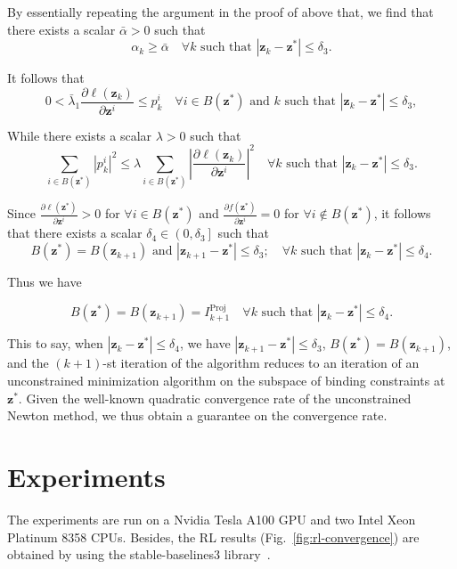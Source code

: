 \documentclass{article}
\theoremstyle{plain}
\theoremstyle{definition}
\def \z {\mathbf{z}}
\begin{document}
By essentially repeating the argument in the proof of above that, we find that there exists a scalar \(\bar{\alpha} > 0\) such that
\[
\alpha_k \geq \bar{\alpha} \quad \forall k \text{ such that } \left|\z_k - \z^*\right| \leq \delta_3.
\]

It follows that
\[
  0 < \bar{\lambda}_1 \frac{\partial \ell\left(\z_k\right)}{\partial \z^i} \leq p_k^i \quad \forall i \in B\left(\z^*\right) \text{ and } k \text{ such that } \left|\z_k - \z^*\right| \leq \delta_3,
\]



While there exists a scalar \(\lambda > 0\) such that
\[
  \sum_{i \in B\left(\z^*\right)}\left|p_k^i\right|^2 \leq \lambda \sum_{i \in B\left(\z^*\right)}\left|\frac{\partial \ell\left(\z_k\right)}{\partial \z^i}\right|^2 \quad \forall k \text{ such that } \left|\z_k - \z^*\right| \leq \delta_3.
\]

Since \(\frac{\partial \ell\left(\z^*\right)}{\partial \z^i} > 0\) for \(\forall i \in {B}\left(\z^*\right)\) and $\frac{\partial f\left(\mathbf{z}^*\right)}{\partial \mathbf{z}^i}=0$ for \(\forall i \notin B\left(\z^*\right)\), it follows that there exists a scalar \(\delta_4 \in \left(0, \delta_3\right]\) such that
\[
  B\left(\z^*\right) = B\left(\z_{k+1}\right) \text{ and }\left|\z_{k+1} - \z^*\right| \leq \delta_3; \quad \forall k \text{ such that } \left|\z_k - \z^*\right| \leq \delta_4.
\]

Thus we have

\[
B\left(\z^*\right) = B\left(\z_{k+1}\right) = I_{k+1}^{\operatorname{Proj}} \quad \forall k \text{ such that } \left|\z_k - \z^*\right| \leq \delta_4.
\]

This to say, when \(\left|\z_k - \z^*\right| \leq \delta_4\), we have \(\left|\z_{k+1} - \z^*\right| \leq \delta_3\), \(B\left(\z^*\right) = B\left(\z_{k+1}\right)\), and the \((k+1)\)-st iteration of the algorithm reduces to an iteration of an unconstrained minimization algorithm on the subspace of binding constraints at \(\z^*\). Given the well-known quadratic convergence rate of the unconstrained Newton method, we thus obtain a guarantee on the convergence rate.


\section{Experiments}
\label{app:exper}
The experiments are run on a Nvidia Tesla A100 GPU and two Intel Xeon Platinum 8358 CPUs. 
Besides, the RL results (Fig.~\ref{fig:rl-convergence}) are obtained by using the stable-baselines3 library~\citep{stable-baselines3}.
\end{document}
